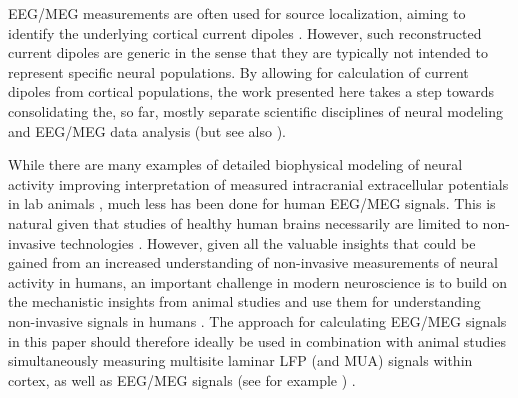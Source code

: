 \documentclass[preprint,10pt,authoryear]{elsarticle}
\begin{document}
EEG/MEG measurements are often used for source localization, aiming to identify the underlying cortical current dipoles \citep{NUNEZ2006, Gramfort2014, Ilmoniemi2019}. However, such reconstructed current dipoles are generic in the sense that they are typically not intended to represent specific neural populations. By allowing for calculation of current dipoles from cortical populations, the work presented here takes a step towards consolidating the, so far, mostly separate scientific disciplines of neural modeling and EEG/MEG data analysis (but see also \cite{NEYMOTIN2020}).

While there are many examples of detailed biophysical modeling of neural activity improving interpretation of measured intracranial extracellular potentials in lab animals \citep{Einevoll2007, Blomquist2009, McColgan2017, Luo2018, Chatzikalymniou2018, Telenczuk2019}, much less has been done for human EEG/MEG signals. This is natural given that studies of healthy human brains necessarily are limited to non-invasive technologies \citep{SILVA2013, Uhlirova2016, COHEN2017}.
However, given all the valuable insights that could be gained from an increased understanding of non-invasive measurements of neural activity in humans, an important challenge in modern neuroscience is to build on the mechanistic insights from animal studies and use them for understanding non-invasive signals in humans \citep{SILVA2013, Uhlirova2016, COHEN2017, EINEVOLL2019, MAKI2019}.
The approach for calculating EEG/MEG signals in this paper should therefore ideally be used in combination with animal studies simultaneously measuring multisite laminar LFP (and MUA) signals within cortex, as well as EEG/MEG signals (see for example \cite{BRUYNS2017}) \citep{COHEN2017}.
\end{document}
